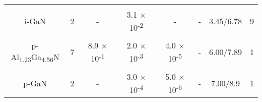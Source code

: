 \begin{table}[!h]
{\begin{minipage}{17cm}
{\begin{tabular}{cccccccc}
\cellcolor{Gray} & \cellcolor{Gray} & \cellcolor{Gray} & \cellcolor{Gray} & \cellcolor{Gray} & \cellcolor{Gray} & \cellcolor{Gray} & \cellcolor{Gray} \\
\multirow{-2}{*}{\cellcolor{Gray} i-GaN} & \multirow{-2}{*}{\cellcolor{Gray} 2} & \multirow{-2}{*}{\cellcolor{Gray} -} & \multirow{-2}{*}{\cellcolor{Gray} 3.1 $\times$ 10\textsuperscript{-2}} & \multirow{-2}{*}{\cellcolor{Gray} -} & \multirow{-2}{*}{\cellcolor{Gray} -} & \multirow{-2}{*}{\cellcolor{Gray} 3.45/6.78} & \multirow{-2}{*}{\cellcolor{Gray} 9} \\

\cellcolor{White} & \cellcolor{White} & \cellcolor{White} & \cellcolor{White} & \cellcolor{White} & \cellcolor{White} & \cellcolor{White} & \cellcolor{White} \\
\multirow{-2}{*}{\cellcolor{White} p-Al\textsubscript{1.23}Ga\textsubscript{4.56}N} & \multirow{-2}{*}{\cellcolor{White} 7} & \multirow{-2}{*}{\cellcolor{White} 8.9 $\times$ 10\textsuperscript{-1}} & \multirow{-2}{*}{\cellcolor{White} 2.0 $\times$ 10\textsuperscript{-3}} & \multirow{-2}{*}{\cellcolor{White} 4.0 $\times$ 10\textsuperscript{-5}} & \multirow{-2}{*}{\cellcolor{White} -} & \multirow{-2}{*}{\cellcolor{White} 6.00/7.89} & \multirow{-2}{*}{\cellcolor{White} 1} \\

\cellcolor{Gray} & \cellcolor{Gray} & \cellcolor{Gray} & \cellcolor{Gray} & \cellcolor{Gray} & \cellcolor{Gray} & \cellcolor{Gray} & \cellcolor{Gray} \\
\multirow{-2}{*}{\cellcolor{Gray} p-GaN} & \multirow{-2}{*}{\cellcolor{Gray} 2} & \multirow{-2}{*}{\cellcolor{Gray} -} & \multirow{-2}{*}{\cellcolor{Gray} 3.0 $\times$ 10\textsuperscript{-4}} & \multirow{-2}{*}{\cellcolor{Gray} 5.0 $\times$ 10\textsuperscript{-6}} & \multirow{-2}{*}{\cellcolor{Gray} -} & \multirow{-2}{*}{\cellcolor{Gray} 7.00/8.9} & \multirow{-2}{*}{\cellcolor{Gray} 1} \\
\bottomrule
\end{tabular}
}
\end{minipage}
}
\end{table}


\clearpage
{}
\specialsection
\headerspecialsection

{\hypersetup{urlcolor=ntnu,linkcolor=sophia} %


}

